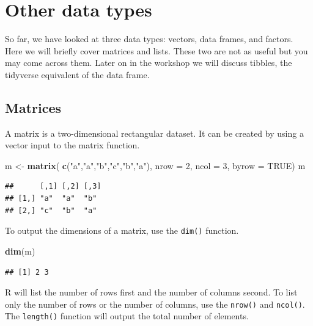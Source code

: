 \documentclass[]{book}
\newenvironment{Shaded}{\begin{snugshade}}{\end{snugshade}}
\newcommand{\DataTypeTok}[1]{\textcolor[rgb]{0.13,0.29,0.53}{#1}}
\newcommand{\DecValTok}[1]{\textcolor[rgb]{0.00,0.00,0.81}{#1}}
\newcommand{\KeywordTok}[1]{\textcolor[rgb]{0.13,0.29,0.53}{\textbf{#1}}}
\newcommand{\NormalTok}[1]{#1}
\newcommand{\OtherTok}[1]{\textcolor[rgb]{0.56,0.35,0.01}{#1}}
\newcommand{\StringTok}[1]{\textcolor[rgb]{0.31,0.60,0.02}{#1}}
\begin{document}
\hypertarget{other-data-types}{%
\section{Other data types}\label{other-data-types}}

So far, we have looked at three data types: vectors, data frames, and factors. Here we will briefly cover matrices and lists. These two are not as useful but you may come across them. Later on in the workshop we will discuss tibbles, the tidyverse equivalent of the data frame.

\hypertarget{matrices}{%
\subsection*{Matrices}\label{matrices}}

A matrix is a two-dimensional rectangular dataset. It can be created by using a vector input to the matrix function.

\begin{Shaded}
\begin{Highlighting}[]
\NormalTok{m <-}\StringTok{ }\KeywordTok{matrix}\NormalTok{( }\KeywordTok{c}\NormalTok{(}\StringTok{"a"}\NormalTok{,}\StringTok{"a"}\NormalTok{,}\StringTok{"b"}\NormalTok{,}\StringTok{"c"}\NormalTok{,}\StringTok{"b"}\NormalTok{,}\StringTok{"a"}\NormalTok{), }\DataTypeTok{nrow =} \DecValTok{2}\NormalTok{, }\DataTypeTok{ncol =} \DecValTok{3}\NormalTok{, }\DataTypeTok{byrow =} \OtherTok{TRUE}\NormalTok{)}
\NormalTok{m}
\end{Highlighting}
\end{Shaded}

\begin{verbatim}
##      [,1] [,2] [,3]
## [1,] "a"  "a"  "b" 
## [2,] "c"  "b"  "a"
\end{verbatim}

To output the dimensions of a matrix, use the \texttt{dim()} function.

\begin{Shaded}
\begin{Highlighting}[]
\KeywordTok{dim}\NormalTok{(m) }
\end{Highlighting}
\end{Shaded}

\begin{verbatim}
## [1] 2 3
\end{verbatim}

R will list the number of rows first and the number of columns second. To list only the number of rows or the number of columns, use the \texttt{nrow()} and \texttt{ncol()}. The \texttt{length()} function will output the total number of elements.
\end{document}
